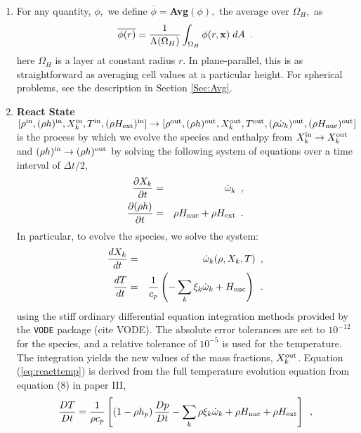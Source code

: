 \begin{enumerate}

\item For any quantity, $\phi,$ we define $\overline{\phi} = ${\bf Avg}$(\phi),$ 
the average over $\Omega_H,$ as
\begin{equation}
\overline{\phi(r)}
= \frac{1}{\mathrm{A}(\Omega_H)}\int_{\Omega_H} \phi(r,{\bf x}) \; dA \enskip .
\end{equation}
here $\Omega_H$ is a layer at constant radius $r$.  In plane-parallel, this is 
as straightforward as averaging cell values at a particular height.  For spherical 
problems, see the description in Section \ref{Sec:Avg}.

\item {\bf React State}$[\rho^{\mathrm{in}},(\rho h)^{\mathrm{in}},X_k^{\mathrm{in}},T^{\mathrm{in}}, (\rho{H_{\rm ext}})^{\mathrm{in}}]\rightarrow [\rho^{\mathrm{out}}, (\rho h)^{\mathrm{out}}, X_k^{\mathrm{out}}, T^{\mathrm{out}}, (\rho \dot{\omega}_k)^{\mathrm{out}}, (\rho{H_{\rm nuc}})^{\mathrm{out}}]$ \\
is the process by which we evolve the species and enthalpy from 
$X_k^{\mathrm{in}} \rightarrow X_k^{\mathrm{out}}$ 
and $(\rho h)^{\mathrm{in}} \rightarrow (\rho h)^{\mathrm{out}}$ by solving the following 
system of equations over a time interval of  $\Delta t/2$,
\begin{eqnarray}
\frac{\partial X_k}{\partial t} &=& \dot{\omega}_k\enskip,\\
\frac{\partial (\rho h)}{\partial t} &=& \rho {H_{\rm nuc}} + \rho {H_{\rm ext}}\enskip .
\end{eqnarray}
  In particular, to evolve the species, we solve the system:
\begin{eqnarray}
\frac{dX_k}{dt} &=& \dot{\omega}_k(\rho,X_k,T)\enskip, \\
\frac{dT}{dt} &=&\frac{1}{c_p} \left ( -\sum_k \xi_k  \dot{\omega}_k  + {H_{\rm nuc}} \right )
\enskip. \label{eq:reacttemp}
\end{eqnarray}
using the stiff ordinary differential equation integration methods
provided by the {\tt VODE} package (cite VODE).  The absolute error
tolerances are set to $10^{-12}$ for the species, and a relative
tolerance of $10^{-5}$ is used for the temperature.  The integration
yields the new values of the mass fractions, $X_k^{\mathrm{out}}$.  Equation
(\ref{eq:reacttemp}) is derived from the full temperature evolution equation
from equation (8) in paper III,
\begin{equation}
\label{eq:tempenthalpy}
\frac{DT}{Dt} = \frac{1}{\rho c_p} \left[ \left(1 - \rho h_p\right) \frac{D p}{D t}
 - \sum_k \rho \xi_k {\omegadot}_k 
 + \rho \Hnuc + \rho \Hext \right] \enskip , 

\end{equation}
\end{enumerate}
